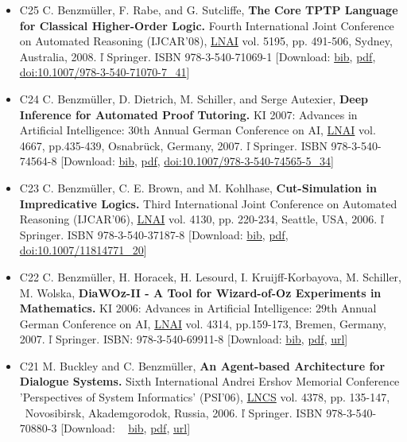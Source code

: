 \documentclass{article}
\newcommand{\tmstrong}[1]{\textbf{#1}}
\newcommand{\tmtextbf}[1]{{\bfseries{#1}}}
\newenvironment{itemizedot}{\begin{itemize} \renewcommand{\labelitemi}{$\bullet$}\renewcommand{\labelitemii}{$\bullet$}\renewcommand{\labelitemiii}{$\bullet$}\renewcommand{\labelitemiv}{$\bullet$}}{\end{itemize}}
\begin{document}
\begin{itemizedot}
  \item [C25] C. Benzm\"uller, F. Rabe, and G. Sutcliffe, \tmtextbf{The Core
  TPTP Language for Classical Higher-Order Logic.} Fourth International Joint
  Conference on Automated Reasoning (IJCAR'08),
  \href{http://www.springer.de/comp/lncs/}{LNAI} vol. 5195, pp. 491-506,
  Sydney, Australia, 2008.  \v{l}  Springer. ISBN 978-3-540-71069-1
  {\color{grey} [Download: {\small \href{../papers/C25.bib}{bib}}, {\small
  \href{../papers/C25.pdf}{pdf}}, {\small
  \href{http://dx.doi.org/10.1007/978-3-540-71070-7\_41}{doi:10.1007/978-3-540-71070-7\_41}}]}
  
  \item [C24] C. Benzm\"uller, D. Dietrich, M. Schiller, and Serge Autexier,
  {\tmstrong{Deep Inference for Automated Proof Tutoring.}} KI 2007: Advances
  in Artificial Intelligence: 30th Annual German Conference on AI,
  \href{http://www.springer.de/comp/lncs/}{LNAI} vol. 4667, pp.435-439,
  Osnabr\"uck, Germany, 2007.  \v{l}  Springer. ISBN 978-3-540-74564-8
  {\color{grey} [Download: {\small \href{../papers/C24.bib}{bib}}, {\small
  \href{../papers/C24.pdf}{pdf}}, {\small
  {\tmstrong{}}\href{http://dx.doi.org/10.1007/978-3-540-74565-5\_34}{doi:10.1007/978-3-540-74565-5\_34}}]}
  
  \item [C23] C. Benzm\"uller, C. E. Brown, and M. Kohlhase,
  \tmtextbf{Cut-Simulation in Impredicative Logics.} Third International Joint
  Conference on Automated Reasoning (IJCAR'06),
  \href{http://www.springer.de/comp/lncs/}{LNAI} vol. 4130, pp. 220-234,
  Seattle, USA, 2006.  \v{l}  Springer. ISBN 978-3-540-37187-8 {\color{grey}
  [Download: {\small \href{../papers/C23.bib}{bib}}, {\small
  \href{../papers/C23.pdf}{pdf}}, {\small
  \href{http://dx.doi.org/10.1007/11814771\_20}{doi:10.1007/11814771\_20}}]}
  
  \item [C22] C. Benzm\"uller, H. Horacek, H. Lesourd, I. Kruijff-Korbayova,
  M. Schiller, M. Wolska, \tmtextbf{DiaWOz-II - A Tool for Wizard-of-Oz
  Experiments in Mathematics.} KI 2006: Advances in Artificial Intelligence:
  29th Annual German Conference on AI,
  \href{http://www.springer.de/comp/lncs/}{LNAI} vol. 4314, pp.159-173,
  Bremen, Germany, 2007.  \v{l}  Springer. ISBN: 978-3-540-69911-8
  {\color{grey} [Download: {\small \href{../papers/C22.bib}{bib}}, {\small
  \href{../papers/C22.pdf}{pdf}}, {\small
  \href{http://www.springerlink.com/content/p2p70782p2386101/}{url}}]}
  
  \item [C21] M. Buckley and C. Benzm\"uller, \tmtextbf{An Agent-based
  Architecture for Dialogue Systems.} Sixth International Andrei Ershov
  Memorial Conference 'Perspectives of System Informatics' (PSI'06),
  \href{http://www.springer.de/comp/lncs/}{LNCS} vol. 4378, pp. 135-147, \
  Novosibirsk, Akademgorodok, Russia, 2006.  \v{l}  Springer. ISBN
  978-3-540-70880-3 {\color{grey} [Download: \ {\small
  \href{../papers/C21.bib}{bib}}, {\small \href{../papers/C21.pdf}{pdf}},
  {\small \href{http://www.springerlink.com/content/h3g45r0m2523521x/}{url}}]}
  

\end{itemizedot}
\end{document}
